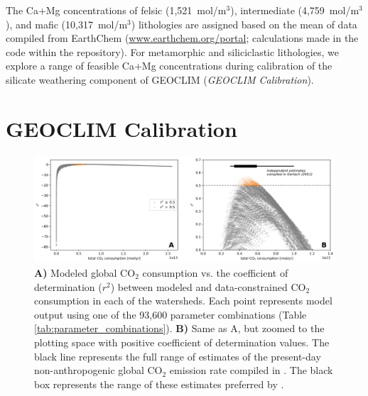 \documentclass[11pt,letterpaper]{article}
\newcommand{\COtwo}{CO$_{2}$\xspace}
\begin{document}
The Ca+Mg concentrations of felsic (1,521~mol/m$^{3}$), intermediate (4,759~mol/m$^{3}$), and mafic (10,317~mol/m$^{3}$) lithologies are assigned based on the mean of data compiled from EarthChem (\url{www.earthchem.org/portal}; calculations made in the code within the repository). For metamorphic and siliciclastic lithologies, we explore a range of feasible Ca+Mg concentrations during calibration of the silicate weathering component of GEOCLIM (\textit{GEOCLIM Calibration}).

\section*{GEOCLIM Calibration}

\begin{figure}[h!]
    \centering
    \includegraphics[width=1\textwidth]{Figures/W_vs_r2.jpg}
    \caption{\textbf{A)} Modeled global \COtwo consumption vs. the coefficient of determination ($r^{2}$) between modeled and data-constrained \COtwo consumption in each of the watersheds. Each point represents model output using one of the 93,600 parameter combinations (Table \ref{tab:parameter_combinations}). \textbf{B)} Same as A, but zoomed to the plotting space with positive coefficient of determination values. The black line represents the full range of estimates of the present-day non-anthropogenic global CO$_{2}$ emission rate compiled in \citet{Gerlach2011a}. The black box represents the range of these estimates preferred by \citet{Gerlach2011a}.}
    \label{fig:W_vs_r2}
\end{figure}
\end{document}
